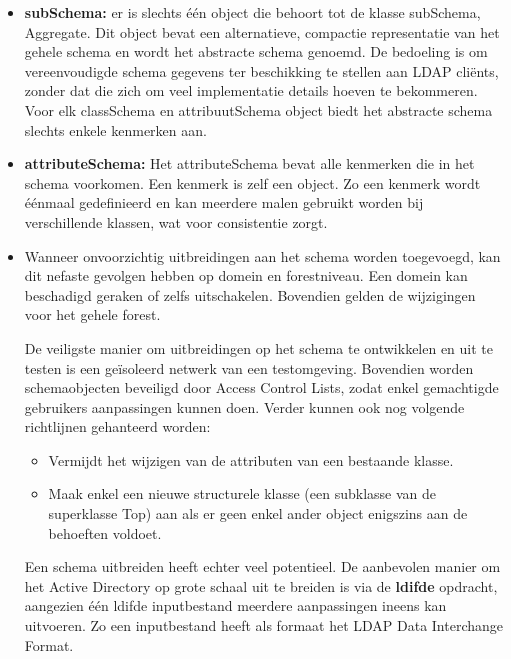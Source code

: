 \documentclass{report}
\begin{document}
\begin{enumerate}
		{ 
			\begin{itemize}
				\item \textbf{subSchema:} er is slechts één object die behoort tot de klasse subSchema, Aggregate. Dit object bevat een alternatieve, compactie representatie van het gehele schema en wordt het abstracte schema genoemd. De bedoeling is om vereenvoudigde schema gegevens ter beschikking te stellen aan LDAP cliënts, zonder dat die zich om veel implementatie details hoeven te bekommeren. Voor elk classSchema en attribuutSchema object biedt het abstracte schema slechts enkele kenmerken aan. 
				\item \textbf{attributeSchema:} Het attributeSchema bevat alle kenmerken die in het schema voorkomen. Een kenmerk is zelf een object. Zo een kenmerk wordt éénmaal gedefinieerd en kan meerdere malen gebruikt worden bij verschillende klassen, wat voor consistentie zorgt.
			\end{itemize}
		}
		
		 { 
			\begin{itemize}
				\item Wanneer onvoorzichtig uitbreidingen aan het schema worden toegevoegd, kan dit nefaste gevolgen hebben op domein en forestniveau. Een domein kan beschadigd geraken of zelfs uitschakelen. Bovendien gelden de wijzigingen voor het gehele forest.
				
				De veiligste manier om uitbreidingen op het schema te ontwikkelen en uit te testen is een geïsoleerd netwerk van een testomgeving. Bovendien worden schemaobjecten beveiligd door Access Control Lists, zodat enkel gemachtigde gebruikers aanpassingen kunnen doen. Verder kunnen ook nog volgende richtlijnen gehanteerd worden:
				\begin{itemize}
					\item Vermijdt het wijzigen van de attributen van een bestaande klasse.
					\item Maak enkel een nieuwe structurele klasse (een subklasse van de superklasse Top) aan als er geen enkel ander object enigszins aan de behoeften voldoet.
				\end{itemize}
				
				Een schema uitbreiden heeft echter veel potentieel. De aanbevolen manier om het Active Directory op grote schaal uit te breiden is via de \textbf{ldifde} opdracht, aangezien één ldifde inputbestand meerdere aanpassingen ineens kan uitvoeren. Zo een inputbestand heeft als formaat het LDAP Data Interchange Format.
			\end{itemize}
		}
	\end{enumerate}
	
\end{document}
